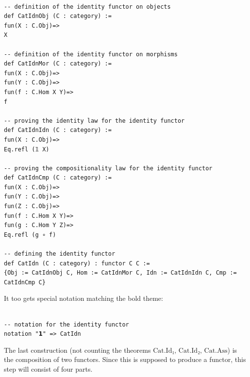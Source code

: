 \documentclass{book}
\newcounter{lcounter}
\begin{document}
\begin{center}
\begin{tcolorbox}[width=5in,colback={white},title={\begin{center}\texttt{Lean \thelcounter} \addtocounter{lcounter}{1}  \end{center}},colbacktitle=Blue,coltitle=black]
\begin{verbatim}

-- definition of the identity functor on objects
def CatIdnObj (C : category) := 
fun(X : C.Obj)=>
X

-- definition of the identity functor on morphisms
def CatIdnMor (C : category) := 
fun(X : C.Obj)=>
fun(Y : C.Obj)=>
fun(f : C.Hom X Y)=>
f

-- proving the identity law for the identity functor
def CatIdnIdn (C : category) := 
fun(X : C.Obj)=>
Eq.refl (𝟙 X)

-- proving the compositionality law for the identity functor 
def CatIdnCmp (C : category) := 
fun(X : C.Obj)=>
fun(Y : C.Obj)=>
fun(Z : C.Obj)=>
fun(f : C.Hom X Y)=>
fun(g : C.Hom Y Z)=>
Eq.refl (g ∘ f)

-- defining the identity functor
def CatIdn (C : category) : functor C C := 
{Obj := CatIdnObj C, Hom := CatIdnMor C, Idn := CatIdnIdn C, Cmp := CatIdnCmp C}

\end{verbatim}%
\end{tcolorbox}
\end{center}

It too gets special notation matching the bold theme:

\begin{center}
\begin{tcolorbox}[width=5in,colback={white},title={\begin{center}\texttt{Lean \thelcounter} \addtocounter{lcounter}{1}  \end{center}},colbacktitle=Blue,coltitle=black]
\begin{verbatim}

-- notation for the identity functor
notation "𝟭" => CatIdn

\end{verbatim}%
\end{tcolorbox}
\end{center}

The last construction (not counting the theorems $\text{Cat.Id₁, Cat.Id₂, Cat.Ass}$) is the composition of two functors. Since this is supposed to produce a functor, this step will consist of four parts.
\end{document}
